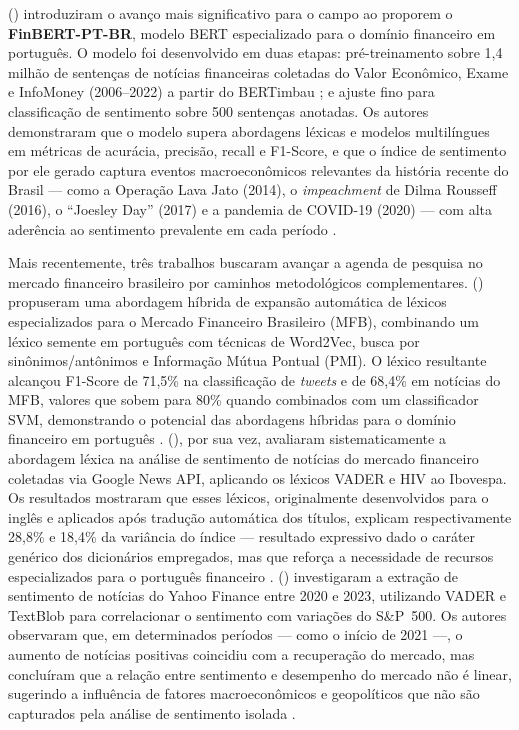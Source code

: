 \citeauthor{santos2023finbert} (\citeyear{santos2023finbert}) introduziram o avanço mais significativo para o campo ao proporem o \textbf{FinBERT-PT-BR}, modelo BERT especializado para o domínio financeiro em português. O modelo foi desenvolvido em duas etapas: pré-treinamento sobre 1,4 milhão de sentenças de notícias financeiras coletadas do Valor Econômico, Exame e InfoMoney (2006--2022) a partir do BERTimbau \cite{souza2020}; e ajuste fino para classificação de sentimento sobre 500 sentenças anotadas. Os autores demonstraram que o modelo supera abordagens léxicas e modelos multilíngues em métricas de acurácia, precisão, recall e F1-Score, e que o índice de sentimento por ele gerado captura eventos macroeconômicos relevantes da história recente do Brasil --- como a Operação Lava Jato (2014), o \textit{impeachment} de
Dilma Rousseff (2016), o ``Joesley Day'' (2017) e a pandemia de COVID-19 (2020) --- com alta aderência ao sentimento prevalente em cada período \cite{santos2023finbert}.

Mais recentemente, três trabalhos buscaram avançar a agenda de pesquisa no mercado financeiro brasileiro por caminhos metodológicos complementares. \citeauthor{sousa2025} (\citeyear{sousa2025}) propuseram uma abordagem híbrida de expansão automática de léxicos especializados para o Mercado Financeiro Brasileiro (MFB), combinando um léxico semente em português com técnicas de Word2Vec, busca por sinônimos/antônimos e Informação Mútua Pontual (PMI). O léxico resultante alcançou F1-Score de 71,5\% na classificação de \textit{tweets} e de 68,4\% em notícias do MFB, valores que sobem para 80\% quando combinados com um classificador SVM, demonstrando o potencial das abordagens híbridas para o domínio financeiro em português \cite{sousa2025}. \citeauthor{lucas2025} (\citeyear{lucas2025}), por sua vez, avaliaram sistematicamente a abordagem
léxica na análise de sentimento de notícias do mercado financeiro coletadas via Google News API, aplicando os léxicos VADER e HIV ao Ibovespa. Os resultados mostraram que esses léxicos, originalmente desenvolvidos para o inglês e aplicados após tradução automática dos títulos, explicam respectivamente 28,8\% e 18,4\% da variância do índice --- resultado expressivo dado o caráter genérico dos dicionários empregados, mas que reforça a necessidade de recursos especializados para o português financeiro \cite{lucas2025}. \citeauthor{silva2025} (\citeyear{silva2025}) investigaram a extração de sentimento de notícias do Yahoo Finance entre 2020 e 2023, utilizando VADER e TextBlob para correlacionar o
sentimento com variações do S\&P~500. Os autores observaram que, em determinados períodos --- como o início de 2021 ---, o aumento de notícias positivas coincidiu com a recuperação do mercado, mas concluíram que a relação entre sentimento e desempenho do mercado não é linear, sugerindo a influência de fatores macroeconômicos e geopolíticos que não são capturados pela análise de sentimento isolada \cite{silva2025}.

